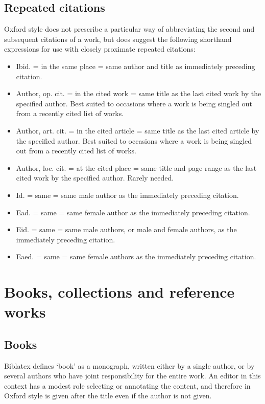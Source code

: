 \documentclass[extrafontsizes,11pt,a4paper,oneside]{memoir}
\newcommand*{\code}[1]{`\textsf{#1}'}
\begin{document}
\subsection{Repeated citations}

Oxford style does not prescribe a particular way of abbreviating the second and subsequent citations of a work, but does suggest the following shorthand expressions for use with closely proximate repeated citations:

\begin{itemize}
  \item Ibid. = in the same place = same author and title as immediately preceding citation.
  \item Author, op. cit. = in the cited work = same title as the last cited work by the specified author. Best suited to occasions where a work is being singled out from a recently cited list of works. 
  \item Author, art. cit. = in the cited article = same title as the last cited article by the specified author. Best suited to occasions where a work is being singled out from a recently cited list of works.
  \item Author, loc. cit. = at the cited place = same title and page range as the last cited work by the specified author. Rarely needed.
  \item Id. = same = same male author as the immediately preceding citation.
  \item Ead. = same = same female author as the immediately preceding citation.
  \item Eid. = same = same male authors, or male and female authors, as the immediately preceding citation.
  \item Eaed. = same = same female authors as the immediately preceding citation.
\end{itemize}

\section{Books, collections and reference works}\label{sec:book}

\subsection{Books}

Biblatex defines \code{book} as a monograph, written either by a single author, or by several authors who have joint responsibility for the entire work. An editor in this context has a modest role selecting or annotating the content, and therefore in Oxford style is given after the title even if the author is not given.
\end{document}
